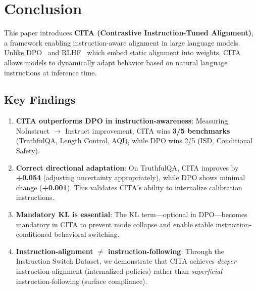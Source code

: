 
\vspace{-2mm}
\section{Conclusion}
\label{sec:conclusion}

This paper introduces \textbf{CITA (Contrastive Instruction-Tuned Alignment)}, a framework enabling instruction-aware alignment in large language models. Unlike DPO~\cite{rafailov2023direct} and RLHF~\cite{ouyang2022training} which embed static alignment into weights, CITA allows models to dynamically adapt behavior based on natural language instructions at inference time.

\vspace{-2mm}
\subsection{Key Findings}
\label{sec:key_findings}

\begin{enumerate}[leftmargin=*,itemsep=2pt]
    \item \textbf{CITA outperforms DPO in instruction-awareness}: Measuring NoInstruct $\rightarrow$ Instruct improvement, CITA wins \textbf{3/5 benchmarks} (TruthfulQA, Length Control, AQI), while DPO wins 2/5 (ISD, Conditional Safety).

    \item \textbf{Correct directional adaptation}: On TruthfulQA, CITA improves by \textbf{+0.054} (adjusting uncertainty appropriately), while DPO shows minimal change (\textbf{+0.001}). This validates CITA's ability to internalize calibration instructions.

    \item \textbf{Mandatory KL is essential}: The KL term---optional in DPO---becomes mandatory in CITA to prevent mode collapse and enable stable instruction-conditioned behavioral switching.

    \item \textbf{Instruction-alignment $\neq$ instruction-following}: Through the Instruction Switch Dataset, we demonstrate that CITA achieves \textit{deeper} instruction-alignment (internalized policies) rather than \textit{superficial} instruction-following (surface compliance).
\end{enumerate}

